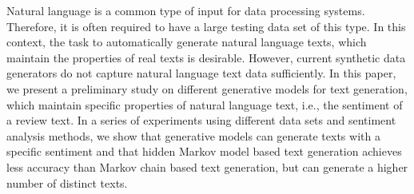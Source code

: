 Natural language is a common type of input for data processing systems. Therefore, it is often required to have a large testing data set of this type. In this context, the task to automatically generate natural language texts, which maintain the properties of real texts is desirable. However, current synthetic data generators do not capture natural language text data sufficiently. In this paper, we present a preliminary study on different generative models for text generation, which maintain specific properties of natural language text, i.e., the sentiment of a review text. In a series of experiments using different data sets and sentiment analysis methods, we show that generative models can generate texts with a specific sentiment and that hidden Markov model based text generation achieves less accuracy than Markov chain based text generation, but can generate a higher number of distinct texts.

